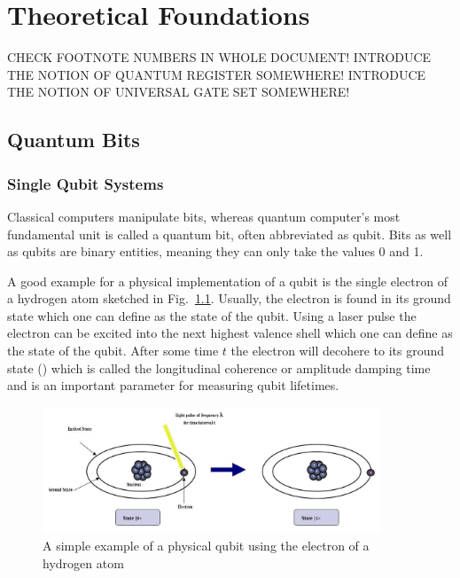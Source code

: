 \chapter{Theoretical Foundations}\label{sec:theory}

CHECK FOOTNOTE NUMBERS IN WHOLE DOCUMENT!
INTRODUCE THE NOTION OF QUANTUM REGISTER SOMEWHERE!
INTRODUCE THE NOTION OF UNIVERSAL GATE SET SOMEWHERE!

\section{Quantum Bits}
\label{subsec:qubits}

\subsection{Single Qubit Systems}
\label{subsubsec:qubits}
Classical computers manipulate bits, whereas quantum computer's most fundamental unit is called a quantum bit, often abbreviated as qubit. Bits as well as qubits are binary entities, meaning they can only take the values 0 and 1.

A good example for a physical implementation of a qubit is the single electron of a hydrogen atom sketched in Fig.~\ref{img:qubitatom}. Usually, the electron is found in its ground state which one can define as the \0 state of the qubit. Using a laser pulse the electron can be excited into the next highest valence shell which one can define as the \1 state of the qubit. After some time $t$ the electron will decohere to its ground state (\0) which is called the longitudinal coherence or amplitude damping time and is an important parameter for measuring qubit lifetimes.

\begin{figure}[!ht]
       \centering
       \includegraphics[width=0.9\textwidth]{img/qubitimplementation.jpeg}
       \caption{\label{img:qubitatom} A simple example of a physical qubit using the electron of a hydrogen atom}
\end{figure}


